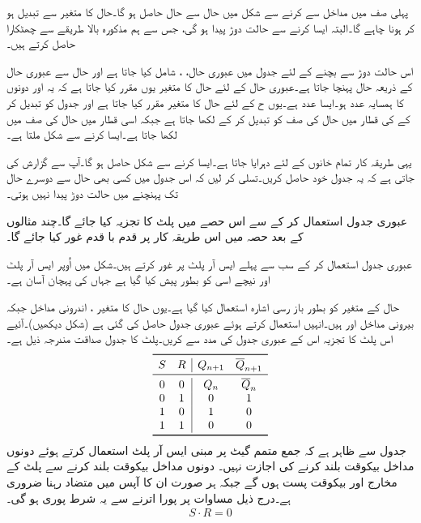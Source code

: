 پہلی صف میں مداخل سے  کرنے سے شکل  میں حال  سے حال حاصل ہو گا۔حال کا متغیر  سے تبدیل ہو کر  ہونا چاہے گا۔البتہ ایسا کرنے سے حالت دوڑ پیدا ہو گی، جس سے ہم مذکورہ بالا طریقے سے چھٹکارا حاصل کرتے ہیں۔

اس حالت دوڑ سے بچنے کے لئے جدول میں عبوری حال،  ، شامل کیا جاتا ہے اور حال  سے عبوری حال  کے ذریعہ حال  پہنچا جاتا ہے۔عبوری حال  کے لئے حال کا متغیر یوں مقرر کیا جاتا ہے کہ یہ  اور  دونوں کا ہمسایہ عدد ہو۔ایسا عدد  ہے۔یوں ح  کے لئے حال کا متغیر  مقرر کیا جاتا ہے اور جدول کو تبدیل کر کے  کی قطار میں حال  کی صف  کو تبدیل کر کے  لکھا جاتا ہے جبکہ اسی قطار میں حال  کی صف میں  لکھا جاتا ہے۔ایسا کرنے سے شکل  ملتا ہے۔

یہی طریقہ کار تمام خانوں کے لئے دہرایا جاتا ہے۔ایسا کرنے سے شکل  حاصل ہو گا۔آپ سے گزارش کی جاتی ہے کہ یہ جدول خود حاصل کریں۔تسلی کر لیں کہ اس جدول میں کسی بھی حال سے دوسرے حال تک پہنچنے میں حالت دوڑ پیدا نہیں ہوتی۔


عبوری جدول استعمال کر کے سے اس حصے میں پلٹ کا تجزیہ کیا جائے گا۔چند مثالوں کے بعد حصہ  میں اس طریقہ کار پر قدم با قدم غور کیا جائے گا۔

عبوری جدول استعمال کر کے سب سے پہلے ایس آر پلٹ پر غور کرتے ہیں۔شکل  میں اُوپر ایس آر پلٹ اور نیچے اسی کو بطور  پیش کیا گیا ہے جہاں  کی پہچان آسان ہے۔

 حال کے متغیر  کو بطور باز رسی اشارہ  استعمال کیا گیا ہے۔یوں حال کا متغیر ، اندرونی مداخل  جبکہ بیرونی مداخل  اور  ہیں۔انہیں استعمال کرتے ہوئے عبوری جدول حاصل کی گئی ہے (شکل  دیکھیں)۔آئیے اس پلٹ کا تجزیہ اس کے عبوری جدول کی مدد سے کریں۔پلٹ کا جدول صداقت مندرجہ ذیل ہے۔
 \begin{align*}
 \begin{array}{cc|cc}
 \toprule
 S&R&Q_{n+1}&\overline{Q}_{n+1}\\
 \midrule
 0&0&Q_n&\overline{Q}_n\\
 0&1&0&1\\
 1&0&1&0\\
 1&1&0&0\\
 \bottomrule
 \end{array}
\end{align*}
 جدول سے ظاہر ہے کہ جمع متمم گیٹ پر مبنی ایس آر پلٹ استعمال کرتے ہوئے دونوں مداخل بیکوقت بلند کرنے کی اجازت نہیں۔ دونوں مداخل بیکوقت بلند کرنے سے پلٹ کے مخارج  اور  بیکوقت پست ہوں گے جبکہ ہر صورت ان کا آپس میں متضاد رہنا ضروری ہے۔درج ذیل مساوات پر پورا اترنے سے یہ شرط پوری ہو گی۔
 \begin{align}
 S\cdot R=0
 \end{align}

